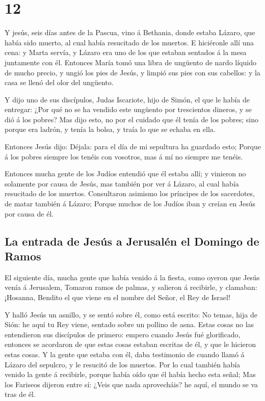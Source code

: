 \hypertarget{section-11}{%
\section{12}\label{section-11}}

 Y jesús, seis días antes de la Pascua, vino á Bethania,
donde estaba Lázaro, que había sido muerto, al cual había resucitado de
los muertos.  E hiciéronle allí una cena: y Marta servía, y
Lázaro era uno de los que estaban sentados á la mesa juntamente con él.
 Entonces María tomó una libra de ungüento de nardo líquido
de mucho precio, y ungió los pies de Jesús, y limpió sus pies con sus
cabellos: y la casa se llenó del olor del ungüento.

 Y dijo uno de sus discípulos, Judas Iscariote, hijo de
Simón, el que le había de entregar:  ¿Por qué no se ha
vendido este ungüento por trescientos dineros, y se dió á los pobres?
 Mas dijo esto, no por el cuidado que él tenía de los
pobres; sino porque era ladrón, y tenía la bolsa, y traía lo que se
echaba en ella.

 Entonces Jesús dijo: Déjala: para el día de mi sepultura ha
guardado esto;  Porque á los pobres siempre los tenéis con
vosotros, mas á mí no siempre me tenéis.

 Entonces mucha gente de los Judíos entendió que él estaba
allí; y vinieron no solamente por causa de Jesús, mas también por ver á
Lázaro, al cual había resucitado de los muertos. 
Consultaron asimismo los príncipes de los sacerdotes, de matar también á
Lázaro;  Porque muchos de los Judíos iban y creían en Jesús
por causa de él.

\hypertarget{la-entrada-de-jesuxfas-a-jerusaluxe9n-el-domingo-de-ramos}{%
\subsection{La entrada de Jesús a Jerusalén el Domingo de
Ramos}\label{la-entrada-de-jesuxfas-a-jerusaluxe9n-el-domingo-de-ramos}}

 El siguiente día, mucha gente que había venido á la
fiesta, como oyeron que Jesús venía á Jerusalem,  Tomaron
ramos de palmas, y salieron á recibirle, y clamaban: ¡Hosanna, Bendito
el que viene en el nombre del Señor, el Rey de Israel!

 Y halló Jesús un asnillo, y se sentó sobre él, como está
escrito:  No temas, hija de Sión: he aquí tu Rey viene,
sentado sobre un pollino de asna.  Estas cosas no las
entendieron sus discípulos de primero: empero cuando Jesús fué
glorificado, entonces se acordaron de que estas cosas estaban escritas
de él, y que le hicieron estas cosas.  Y la gente que
estaba con él, daba testimonio de cuando llamó á Lázaro del sepulcro, y
le resucitó de los muertos.  Por lo cual también había
venido la gente á recibirle, porque había oído que él había hecho esta
señal;  Mas los Fariseos dijeron entre sí: ¿Veis que nada
aprovecháis? he aquí, el mundo se va tras de él.

